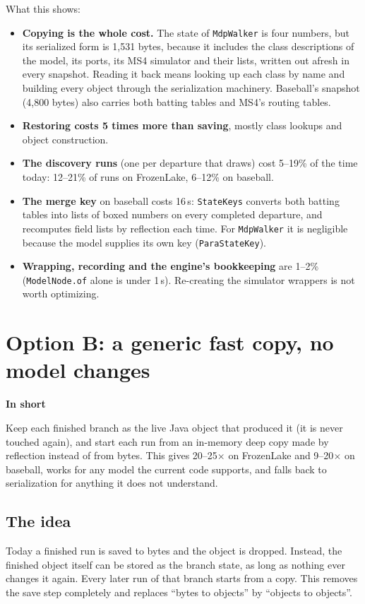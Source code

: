\documentclass[11pt]{article}
\newcommand{\code}[1]{\texttt{#1}}
\newcommand{\shadedbox}[3]{\par\smallskip\noindent\colorbox{#1}{\parbox{\dimexpr\linewidth-2\fboxsep}{\textbf{#2}\par #3}}\par\smallskip}
\newcommand{\takeaway}[1]{\shadedbox{okbg}{In short}{#1}}
\newcommand{\us}{\,\textmu s}
\begin{document}
What this shows:
\begin{itemize}
\item \textbf{Copying is the whole cost.} The state of \code{MdpWalker} is four numbers, but its serialized form is
  1{,}531 bytes, because it includes the class descriptions of the model, its ports, its MS4 simulator and their
  lists, written out afresh in every snapshot. Reading it back means looking up each class by name and building every
  object through the serialization machinery. Baseball's snapshot (4{,}800 bytes) also carries both batting tables
  and MS4's routing tables.
\item \textbf{Restoring costs 5 times more than saving}, mostly class lookups and object construction.
\item \textbf{The discovery runs} (one per departure that draws) cost 5--19\% of the time today: 12--21\% of runs on
  FrozenLake, 6--12\% on baseball.
\item \textbf{The merge key} on baseball costs 16\us{}: \code{StateKeys} converts both batting tables into lists of
  boxed numbers on every completed departure, and recomputes field lists by reflection each time. For \code{MdpWalker}
  it is negligible because the model supplies its own key (\code{ParaStateKey}).
\item \textbf{Wrapping, recording and the engine's bookkeeping} are 1--2\% (\code{ModelNode.of} alone is under
  1\us{}). Re-creating the simulator wrappers is not worth optimizing.
\end{itemize}

\section{Option B: a generic fast copy, no model changes}\label{sec:generic}

\takeaway{Keep each finished branch as the live Java object that produced it (it is never touched again), and start
each run from an in-memory deep copy made by reflection instead of from bytes. This gives 20--25$\times$ on FrozenLake
and 9--20$\times$ on baseball, works for any model the current code supports, and falls back to serialization for
anything it does not understand.}

\subsection{The idea}
Today a finished run is saved to bytes and the object is dropped. Instead, the finished object itself can be stored as
the branch state, as long as nothing ever changes it again. Every later run of that branch starts from a copy. This
removes the save step completely and replaces ``bytes to objects'' by ``objects to objects''.
\end{document}
